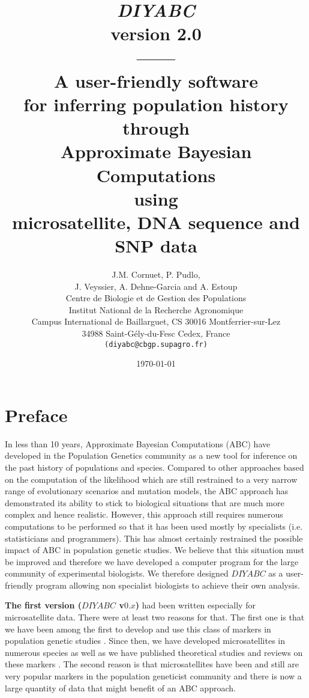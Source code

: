 \documentclass [a4paper]{report}
\title{\Huge \emph{\textbf{DIYABC}} \\ 
version 2.0\\
------\\ 
A user-friendly software \\  
for inferring population history  through \\ 
Approximate Bayesian Computations\\
using\\ 
microsatellite, DNA sequence and SNP data}
\author{
\Large J.M. Cornuet, P. Pudlo,\\ 
\Large J. Veyssier, A. Dehne-Garcia and A. Estoup\\
\vspace{6.0cm}
Centre de Biologie et de Gestion des Populations\\
Institut National de la Recherche Agronomique\\
Campus International de Baillarguet, CS 30016 Montferrier-sur-Lez\\
34988 Saint-G\'ely-du-Fesc Cedex, France\\
\texttt{(diyabc@cbgp.supagro.fr)}}
\date{\today}
\let\sectionv\section
\renewcommand{\section}[1]{\sectionv{#1} \setcounter{paragraph}{0}}
\begin{document}
\maketitle %
\pagestyle{myheadings}
\begin{doublespacing}
\tableofcontents
\end{doublespacing}
\newpage
\section{Preface}
In less than 10 years, Approximate Bayesian Computations (ABC) have developed in the Population Genetics community as a new tool for inference on the past history of populations and species. Compared to other approaches based on the computation of the likelihood which are still restrained to a very narrow range of evolutionary scenarios and mutation models, the ABC approach has demonstrated its ability to stick to biological situations that are much more complex and hence realistic. However, this approach still requires numerous computations to be performed so that it has been used mostly by specialists (i.e. statisticians and programmers). This has almost certainly restrained the possible impact of ABC in population genetic studies. We believe that this situation must be improved and therefore we have developed a computer program for the large community of experimental biologists. We therefore designed $DIYABC$ as a user-friendly program allowing non specialist biologists to achieve their own analysis.\

\textbf{The first version ($DIYABC$ v$0.x$)} had been written especially for microsatellite data. There were at least two reasons for that. The first one is that we have been among the first to develop and use this class of markers in population genetic studies \citep[e.g.][]{E1993}. Since then, we have developed microsatellites in numerous species as well as we have published theoretical studies and reviews on these markers \citep[e.g.][]{E2002}. The second reason is that microsatellites have been and still are very popular markers in the population geneticist community and there is now a large quantity of data that might benefit of an ABC approach.\
\end{document}
